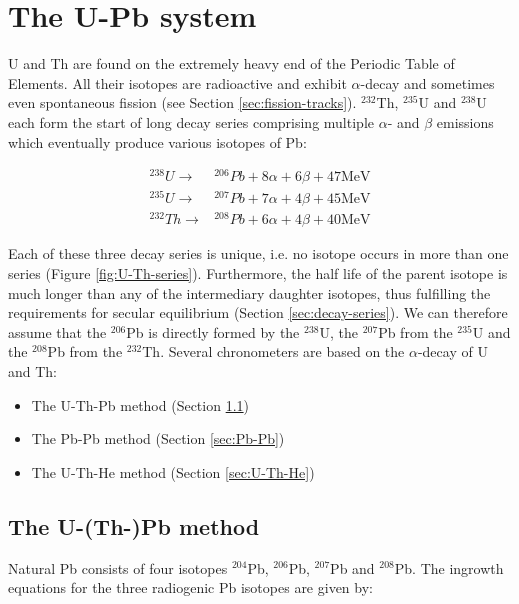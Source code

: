 \documentclass{book}
\begin{document}
\chapter{The U-Pb system}
\label{sec:U-Pb}

U and Th are found on the extremely heavy end of the Periodic Table of
Elements.  All their isotopes are radioactive and exhibit
$\alpha$-decay and sometimes even spontaneous fission (see Section
\ref{sec:fission-tracks}). $^{232}$Th, $^{235}$U and $^{238}$U each
form the start of long decay series comprising multiple $\alpha$- and
$\beta$ emissions which eventually produce various isotopes of Pb:

\begin{equation}
\begin{array}{rl}
^{238}U \rightarrow & {}^{206}Pb + 8\alpha + 6\beta + 47\mbox{MeV} \\ 
^{235}U \rightarrow & {}^{207}Pb + 7\alpha + 4\beta + 45\mbox{MeV} \\
^{232}Th \rightarrow & {}^{208}Pb + 6\alpha + 4\beta + 40\mbox{MeV} 
\end{array}
\label{eq:UThdecay}
\end{equation}

Each of these three decay series is unique, i.e. no isotope occurs in
more than one series (Figure \ref{fig:U-Th-series}). Furthermore, the
half life of the parent isotope is much longer than any of the
intermediary daughter isotopes, thus fulfilling the requirements for
secular equilibrium (Section \ref{sec:decay-series}). We can therefore
assume that the $^{206}$Pb is directly formed by the $^{238}$U, the
$^{207}$Pb from the $^{235}$U and the $^{208}$Pb from the
$^{232}$Th. Several chronometers are based on the $\alpha$-decay of U
and Th:

\begin{itemize}
\item The U-Th-Pb method (Section \ref{sec:U-Th-Pb})
\item The Pb-Pb method (Section \ref{sec:Pb-Pb})
\item The U-Th-He method (Section \ref{sec:U-Th-He})
\end{itemize}

\section{The U-(Th-)Pb method}
\label{sec:U-Th-Pb}

Natural Pb consists of four isotopes $^{204}$Pb, $^{206}$Pb,
$^{207}$Pb and $^{208}$Pb. The ingrowth equations for
the three radiogenic Pb isotopes are given by:
\end{document}
